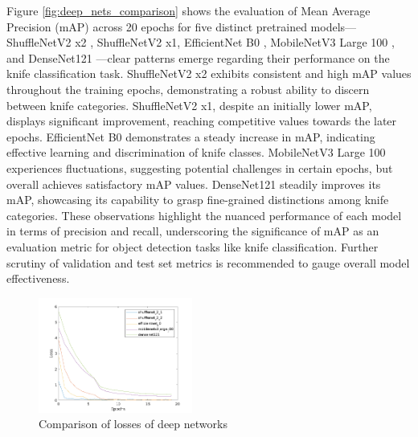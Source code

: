 \documentclass[10pt,twocolumn,letterpaper]{article}
\begin{document}
Figure \ref{fig:deep_nets_comparison} shows the evaluation of Mean Average Precision (mAP) across 20 epochs for five
distinct pretrained models—ShuffleNetV2 x2 \cite{zhang2018shufflenet}, ShuffleNetV2 x1, EfficientNet B0 \cite{tan2019efficientnet}, MobileNetV3 Large 100 \cite{howard2017mobilenets}, and
DenseNet121 \cite{huang2017densely} —clear patterns emerge regarding their performance on the knife classification task. ShuffleNetV2 x2
exhibits consistent and high mAP values throughout the training epochs, demonstrating a robust ability to discern
between knife categories. ShuffleNetV2 x1, despite an initially lower mAP, displays significant improvement, reaching
competitive values towards the later epochs. EfficientNet B0 demonstrates a steady increase in mAP, indicating
effective learning and discrimination of knife classes. MobileNetV3 Large 100 experiences fluctuations, suggesting
potential challenges in certain epochs, but overall achieves satisfactory mAP values. DenseNet121 steadily improves
its mAP, showcasing its capability to grasp fine-grained distinctions among knife categories. These observations
highlight the nuanced performance of each model in terms of precision and recall, underscoring the significance of
mAP as an evaluation metric for object detection tasks like knife classification. Further scrutiny of validation and
test set metrics is recommended to gauge overall model effectiveness.


\begin{figure}[htbp]
  \begin{center}
    \includegraphics[width=0.45\textwidth]{./assets/deep_nets_loss_comparison.png}
    \captionsetup{justification=centering}
    \caption{Comparison of losses of deep networks}
    \label{fig:deep_nets_loss_comparison}
  \end{center}
\end{figure}
\end{document}
